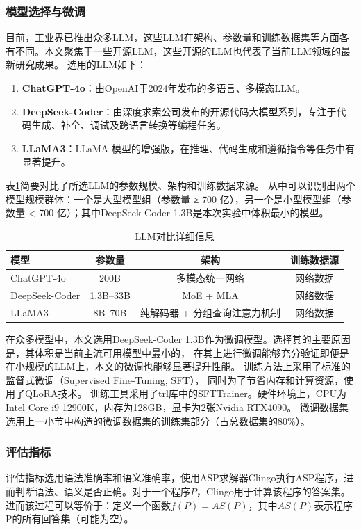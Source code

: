 \subsubsection{模型选择与微调}
目前，工业界已推出众多LLM，这些LLM在架构、参数量和训练数据集等方面各有不同。本文聚焦于一些开源LLM，这些开源的LLM也代表了当前LLM领域的最新研究成果。
选用的LLM如下：
\begin{enumerate}[nosep]
\item \textbf{ChatGPT-4o}：由OpenAI于2024年发布的多语言、多模态LLM。
\item \textbf{DeepSeek-Coder}：由深度求索公司发布的开源代码大模型系列，专注于代码生成、补全、调试及跨语言转换等编程任务。
\item \textbf{LLaMA3}：LLaMA 模型的增强版，在推理、代码生成和遵循指令等任务中有显著提升。
\end{enumerate}
表\ref{tab:llm-comparison}简要对比了所选LLM的参数规模、架构和训练数据来源。
从中可以识别出两个模型规模群体：一个是大型模型组（参数量 ≥ 700 亿），另一个是小型模型组（参数量 < 700 亿）；其中DeepSeek-Coder 1.3B是本次实验中体积最小的模型。

\begin{table}[ht]
    \centering
    \begin{tabular}{lccc}
        \toprule
        \textbf{模型} & \textbf{参数量} & \textbf{架构} & \textbf{训练数据源} \\
        \midrule
        ChatGPT-4o    & 200B      & 多模态统一网络           & 网络数据         \\
        DeepSeek-Coder       & 1.3B--33B      & MoE + MLA            & 网络数据    \\
        LLaMA3         & 8B--70B   & 纯解码器 + 分组查询注意力机制   & 网络数据         \\
        \bottomrule
    \end{tabular}
    \caption{LLM对比详细信息}
    \label{tab:llm-comparison}
\end{table}

在众多模型中，本文选用DeepSeek-Coder 1.3B作为微调模型。选择其的主要原因是，其体积是当前主流可用模型中最小的，
在其上进行微调能够充分验证即便是在小规模的LLM上，本文的微调也能够显著提升性能。
训练方法上采用了标准的监督式微调（Supervised Fine-Tuning, SFT），
同时为了节省内存和计算资源，使用了QLoRA技术。
训练工具采用了trl库中的SFTTrainer。硬件环境上，CPU为Intel Core i9 12900K，内存为128GB，显卡为2张Nvidia RTX4090。
微调数据集选用上一小节中构造的微调数据集的训练集部分（占总数据集的80\%）。

\subsubsection{评估指标}
评估指标选用语法准确率和语义准确率，使用ASP求解器Clingo执行ASP程序，进而判断语法、语义是否正确。对于一个程序$P$，Clingo用于计算该程序的答案集。
进而该过程可以等价于：定义一个函数$f(P) = AS(P)$，其中$AS(P)$表示程序P的所有回答集（可能为空）。

